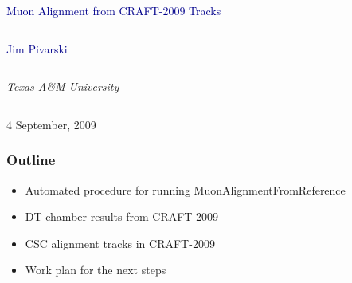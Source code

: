 \documentclass[compress]{beamer}
\begin{document}
\begin{frame}
\vfill
\begin{center}
\textcolor{darkblue}{\Large Muon Alignment from CRAFT-2009 Tracks}

\vfill
\begin{columns}
\begin{center}
\large
\textcolor{darkblue}{Jim Pivarski}
\end{center}
\end{columns}

\begin{columns}
\begin{center}
\scriptsize
{\it Texas A\&M University}
\end{center}
\end{columns}

\vfill
 4 September, 2009

\end{center}
\end{frame}


\small

\begin{frame}
\frametitle{Outline}
\begin{itemize}\setlength{\itemsep}{0.5 cm}
\item Automated procedure for running MuonAlignmentFromReference
\item DT chamber results from CRAFT-2009
\item CSC alignment tracks in CRAFT-2009
\item Work plan for the next steps
\end{itemize}
\end{frame}
\end{document}
